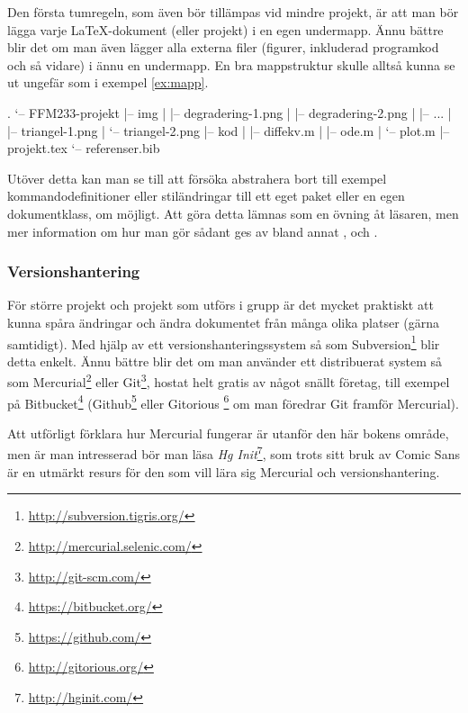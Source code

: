 \documentclass[lang=sv,ptsize=10pt,font=none,nomath,titles=bf,../../a4.tex]{subfiles}
\begin{document}
Den första tumregeln, som även bör tillämpas vid mindre projekt, är att
man bör lägga varje \LaTeX-dokument (eller projekt) i en egen undermapp.
Ännu bättre blir det om man även lägger alla externa filer (figurer,
inkluderad programkod och så vidare) i ännu en undermapp. En bra
mappstruktur skulle alltså kunna se ut ungefär som i exempel
\vref{ex:mapp}.

\begin{kod}
	\begin{textcode}
.
`-- FFM233-projekt
|-- img
|   |-- degradering-1.png
|   |-- degradering-2.png
|   |-- ...
|   |-- triangel-1.png
|   `-- triangel-2.png
|-- kod
|   |-- diffekv.m
|   |-- ode.m
|   `-- plot.m
|-- projekt.tex
`-- referenser.bib
	\end{textcode}
	\caption{En bra mappstruktur för ett enkelt \LaTeX-projekt.}
	\label{ex:mapp}
\end{kod}

Utöver detta kan man se till att försöka abstrahera bort till exempel
kommandodefinitioner eller stiländringar till ett eget paket eller en
egen dokumentklass, om möjligt. Att göra detta lämnas som en övning åt
läsaren, men mer information om hur man gör sådant ges av bland annat
,  och .

\subsubsection{Versionshantering}
För större projekt och projekt som utförs i grupp är det mycket praktiskt
att kunna spåra ändringar och ändra dokumentet från många olika platser
(gärna samtidigt). Med hjälp av ett versionshanteringssystem så som 
Subversion\footnote{\url{http://subversion.tigris.org/}} blir detta
enkelt. Ännu bättre blir det om man använder ett distribuerat system så
som Mercurial\footnote{\url{http://mercurial.selenic.com/}} eller
Git\footnote{\url{http://git-scm.com/}}, hostat helt gratis av något snällt
företag, till exempel på Bitbucket\footnote{\url{https://bitbucket.org/}}
(Github\footnote{\url{https://github.com/}} eller Gitorious%
\footnote{\url{http://gitorious.org/}} om man föredrar Git framför Mercurial).

\newpage
Att utförligt förklara hur Mercurial fungerar är utanför den här bokens
område, men är man intresserad bör man läsa
\emph{Hg Init}\footnote{\url{http://hginit.com/}}, som trots sitt bruk av
Comic Sans är en utmärkt resurs för den som vill lära sig Mercurial och
versionshantering.
\end{document}
